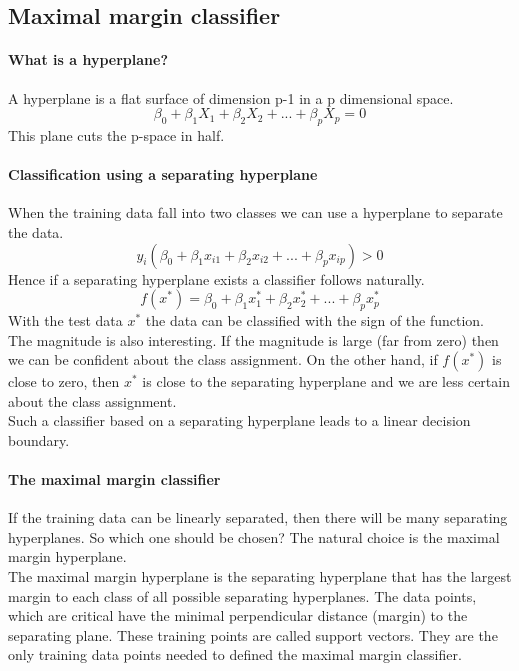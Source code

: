 \documentclass[../document.tex]{subfiles}
\begin{document}
	
	\subsection{Maximal margin classifier}
	\paragraph{What is a hyperplane?}
	A hyperplane is a flat surface of dimension p-1 in a p dimensional space. 
	\begin{equation}
		\beta_{0}+\beta_{1}X_{1}+\beta_{2}X_{2}+...+\beta_{p}X_{p}=0
	\end{equation}
	This plane cuts the p-space in half.
	\paragraph{Classification using a separating hyperplane}
	When the training data fall into two classes we can use a hyperplane to separate the data. 
	\begin{equation}
		y_{i}(\beta_{0}+\beta_{1}x_{i1}+\beta_{2}x_{i2}+...+\beta_{p}x_{ip}) > 0
	\end{equation}
	Hence if a separating hyperplane exists a classifier follows naturally. 
	\begin{equation}
		f(x^*)=\beta_{0}+\beta_{1}x_{1}^*+\beta_{2}x_{2}^*+...+\beta_{p}x_{p}^*
	\end{equation}
	With the test data \(x^*\) the data can be classified with the sign of the function. The magnitude is also interesting. If the magnitude is large (far from zero) then we can be confident about the class assignment. On the other hand, if \(f(x^*)\) is close to zero, then \(x^*\) is close to the separating hyperplane and we are less certain about the class assignment.\\
	Such a classifier based on a separating hyperplane leads to a linear decision boundary. 
	\paragraph{The maximal margin classifier}
	If the training data can be linearly separated, then there will be many separating hyperplanes. So which one should be chosen? The natural choice is the maximal margin hyperplane.\\
	The maximal margin hyperplane is the separating hyperplane that has the largest margin to each class of all possible separating hyperplanes. The data points, which are critical have the minimal perpendicular distance (margin) to the separating plane. These training points are called support vectors. They are the only training data points needed to defined the maximal margin classifier.
\end{document}
